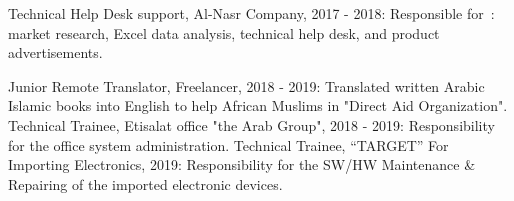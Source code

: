 



\begin{cvskills}
  \cvskill
    {\scriptsize Technical Help Desk support, Al-Nasr Company, 2017 - 2018:} %
    {\scriptsize Responsible for\ : market research, Excel data analysis, technical help desk, and product advertisements.} %

  \cvskill
    {\scriptsize Junior Remote Translator, Freelancer, 2018 - 2019: } %
    {\scriptsize Translated written Arabic Islamic books into English to help African Muslims in "Direct Aid Organization".} %
  \cvskill
    {\scriptsize Technical Trainee, Etisalat office "the Arab Group", 2018 - 2019:} %
    {\scriptsize Responsibility for the office system administration.} %
  \cvskill
    {\scriptsize Technical Trainee, “TARGET” For Importing Electronics, 2019: } %
    {\scriptsize Responsibility for the SW/HW Maintenance \& Repairing of the imported electronic devices.} %
    
\end{cvskills}

 

